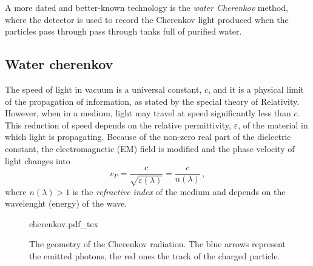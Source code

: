  A more dated and better-known technology is the \emph{water Cherenkov} method, where the detector is used to %
 record the Cherenkov light produced when the particles pass through pass through tanks full of purified water. 

\subsection{Water cherenkov}
\label{sec:wch}

 The speed of light in vacuum is a universal constant, $c$, and it is a physical limit of the propagation %
 of information, as stated by the special theory of Relativity.
 However, when in a medium, light may travel at speed significantly less than $c$.
 This reduction of speed depends on the relative permittivity, $\varepsilon$, of the material in which light is %
 propagating.
 Because of the non-zero real part of the dielectric constant, the electromagnetic (EM) field is modified and %
 the phase velocity of light changes into
 \begin{equation}
   \label{eq:light}
   v_P = \frac{c}{\sqrt{\varepsilon(\lambda)}} = \frac{c}{n(\lambda)}\,,
 \end{equation}
 where $n(\lambda) > 1$ is the \emph{refractive index} of the medium and %
 depends on the wavelenght (energy) of the wave.

 \begin{wrapfigure}{R}{0.5\textwidth}
   \centering
   \def\svgwidth{0.4\textwidth}
   {cherenkov.pdf_tex}
   \caption{The geometry of the Cherenkov radiation. The blue arrows represent the emitted photons, the red ones %
   the track of the charged particle.}
   \label{fig:cherenkov}
 \end{wrapfigure}

